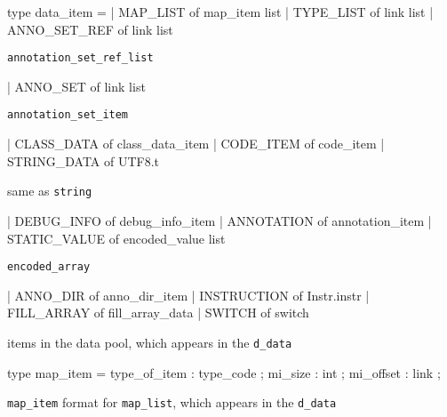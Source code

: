 \documentclass[11pt]{article}
\begin{document}
\label{type:Dex.data-underscoreitem}\begin{ocamldoccode}
type data_item =
  | MAP_LIST of map_item list
  | TYPE_LIST of link list
  | ANNO_SET_REF of link list
\end{ocamldoccode}
\begin{ocamldoccomment}
{\tt{annotation\_set\_ref\_list}}
\end{ocamldoccomment}
\begin{ocamldoccode}
  | ANNO_SET of link list
\end{ocamldoccode}
\begin{ocamldoccomment}
{\tt{annotation\_set\_item}}
\end{ocamldoccomment}
\begin{ocamldoccode}
  | CLASS_DATA of class_data_item
  | CODE_ITEM of code_item
  | STRING_DATA of UTF8.t
\end{ocamldoccode}
\begin{ocamldoccomment}
same as {\tt{string}}
\end{ocamldoccomment}
\begin{ocamldoccode}
  | DEBUG_INFO of debug_info_item
  | ANNOTATION of annotation_item
  | STATIC_VALUE of encoded_value list
\end{ocamldoccode}
\begin{ocamldoccomment}
{\tt{encoded\_array}}
\end{ocamldoccomment}
\begin{ocamldoccode}
  | ANNO_DIR of anno_dir_item
  | INSTRUCTION of Instr.instr
  | FILL_ARRAY of fill_array_data
  | SWITCH of switch
\end{ocamldoccode}
\begin{ocamldocdescription}
items in the data pool, which appears in the {\tt{d\_data}}


\end{ocamldocdescription}




\label{type:Dex.map-underscoreitem}\begin{ocamldoccode}
type map_item = {}
  type_of_item : type_code ;
  mi_size : int ;
  mi_offset : link ;
{}
\end{ocamldoccode}
\begin{ocamldocdescription}
{\tt{map\_item}} format for {\tt{map\_list}}, which appears in the {\tt{d\_data}}


\end{ocamldocdescription}
\end{document}

